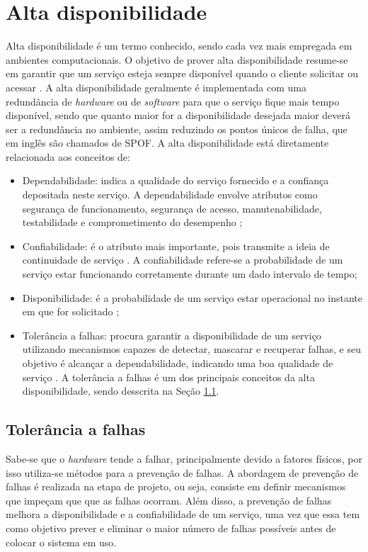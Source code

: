 \chapter{Alta disponibilidade}
\label{cap:altadisponibilidade}

Alta disponibilidade é um termo conhecido, sendo cada vez mais empregada em ambientes computacionais. O objetivo de prover
alta disponibilidade resume-se em garantir que um serviço esteja sempre disponível quando o cliente solicitar ou acessar \cite{costa2009}.
A alta disponibilidade geralmente é implementada com uma redundância de \textit{hardware} ou de \textit{software} para que o serviço 
fique mais tempo disponível, sendo que quanto maior for a disponibilidade desejada maior deverá ser a redundância no ambiente, assim 
reduzindo os pontos únicos de falha, que em inglês são chamados de \ac{SPOF}. A alta disponibilidade está diretamente relacionada aos 
conceitos de: 
\begin{itemize}
 \item Dependabilidade: indica a qualidade do serviço fornecido e a confiança depositada neste serviço. A dependabilidade envolve atributos 
 como segurança de funcionamento, segurança de acesso, manutenabilidade, testabilidade e comprometimento do desempenho \cite{weber2002};
 \item Confiabilidade: é o atributo mais importante, pois transmite a ideia de continuidade de serviço \cite{pankaj1994}. A confiabilidade 
 refere-se a probabilidade de um serviço estar funcionando corretamente durante um dado intervalo de tempo;
 \item Disponibilidade: é a probabilidade de um serviço estar operacional no instante em que for solicitado \cite{costa2009};
 \item Tolerância a falhas: procura garantir a disponibilidade de um serviço utilizando mecanismos capazes de detectar, mascarar e recuperar 
 falhas, e seu objetivo é alcançar a dependabilidade, indicando uma boa qualidade de serviço \cite{costa2009}. A tolerância a falhas é 
 um dos principais conceitos da alta disponibilidade, sendo desscrita na Seção \ref{section:toleranciafalhas}.
\end{itemize}

\section{Tolerância a falhas}
\label{section:toleranciafalhas}

Sabe-se que o \textit{hardware} tende a falhar, principalmente devido a fatores físicos, por isso utiliza-se métodos para a prevenção 
de falhas. A abordagem de prevenção de falhas é realizada na etapa de projeto, ou seja, consiste em definir mecanismos que impeçam que 
que as falhas ocorram. Além disso, a prevenção de falhas melhora a disponibilidade e a confiabilidade de um serviço, uma vez que essa 
tem como objetivo prever e eliminar o maior número de falhas possíveis antes de colocar o sistema em uso. 

